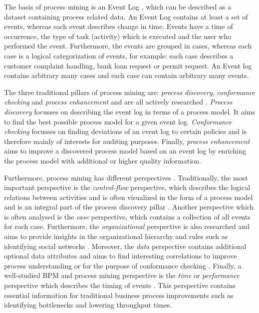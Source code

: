 The basis of process mining is an Event Log \cite{aalst2016process}, which can be described as a dataset containing process related data. An Event Log contains at least a set of events, whereas each event describes change in time. Events have a time of occurrence, the type of task (activity) which is executed and the user who performed the event. Furthermore, the events are grouped in cases, whereas each case is a logical categorization of events, for example: each case describes a customer complaint handling, bank loan request or permit request. An Event log contains arbitrary many cases and each case can contain arbitrary many events.  

The three traditional pillars of process mining are: \textit{process discovery}, \textit{conformance checking} and \textit{process enhancement} and are all actively researched \cite{aalst2016process,aalst2011process}. \textit{Process discovery} focusses on describing the event log in terms of a process model. It aims to find the best possible process model for a given event log. \textit{Conformance checking} focusses on finding deviations of an event log to certain policies and is therefore mainly of interests for auditing purposes. Finally, \textit{process enhancement} aims to improve a discovered process model based on an event log by enriching the process model with additional or higher quality information.  

Furthermore, process mining has different perspectives \cite{aalst2016process}. Traditionally, the most important perspective is the \textit{control-flow} perspective, which describes the logical relations between activities and is often visualized in the form of a process model and is an integral part of the process discovery pillar \cite{discovery}. Another perspective which is often analysed is the \textit{case} perspective, which contains a collection of all events for each case. Furthermore, the \textit{organizational} perspective is also researched and aims to provide insights in the organizational hierarchy and rules such as identifying social networks \cite{van2007business,socialmining}. Moreover, the \textit{data} perspective contains additional optional data attributes and aims to find interesting correlations to improve process understanding or for the purpose of conformance checking \cite{DeLeoni2012,rogge2016log}. Finally, a well-studied BPM and process mining perspective is the \textit{time} or \textit{performance} perspective which describes the timing of events \cite{hornix2007performance,aalst2012replaying, aalst2009performancevis}. This perspective contains essential information for traditional business process improvements such as identifying bottlenecks and lowering throughput times.

